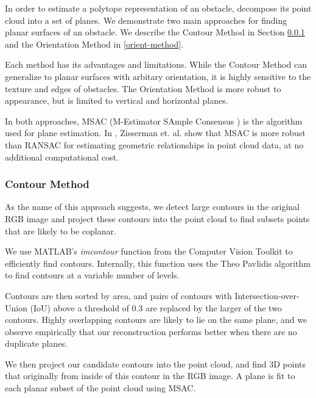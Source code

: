 In order to estimate a polytope representation of an obstacle, decompose its point cloud into a set of planes. We demonstrate two main approaches for finding planar surfaces of an obstacle. We describe the Contour Method in Section \ref{contour-method} and the Orientation Method in \ref{orient-method}.

Each method has its advantages and limitations. While the Contour Method can generalize to planar surfaces with arbitary orientation, it is highly sensitive to the texture and edges of obstacles. The Orientation Method is more robust to appearance, but is limited to vertical and horizontal planes.

In both approaches, MSAC (M-Estimator SAmple Consensus \cite{msac-article}) is the algorithm used for plane estimation. In \cite{msac-article}, Zisserman et. al. show that MSAC is more robust than RANSAC for estimating geometric relationships in point cloud data, at no additional computational cost.

\subsubsection{Contour Method} \label{contour-method}

As the name of this approach suggests, we detect large contours in the original RGB image and project these contours into the point cloud to find subsets points that are likely to be coplanar.

We use MATLAB's \textit{imcontour} function from the Computer Vision Toolkit to efficiently find contours. Internally, this function uses the Theo Pavlidis algorithm \cite{pavlidis} to find contours at a variable number of levels.

Contours are then sorted by area, and pairs of contours with Intersection-over-Union (IoU) above a threshold of 0.3 are replaced by the larger of the two contours. Highly overlapping contours are likely to lie on the same plane, and we observe empirically that our reconstruction performs better when there are no duplicate planes.

We then project our candidate contours into the point cloud, and find 3D points that originally from inside of this contour in the RGB image. A plane is fit to each planar subset of the point cloud using MSAC.

